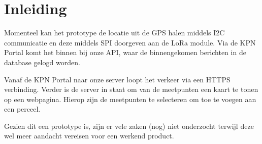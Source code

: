 \section{Inleiding}
Momenteel kan het prototype de locatie uit de GPS halen middels I2C communicatie en
deze middels SPI doorgeven aan de LoRa module. Via de KPN Portal komt het binnen
bij onze API, waar de binnengekomen berichten in de database gelogd worden.

Vanaf de KPN Portal naar onze server loopt het verkeer via een HTTPS verbinding.
Verder is de server in staat om van de meetpunten een kaart te tonen op een webpagina.
Hierop zijn de meetpunten te selecteren om toe te voegen aan een perceel.

Gezien dit een prototype is, zijn er vele zaken (nog) niet onderzocht terwijl deze
wel meer aandacht vereisen voor een werkend product.
